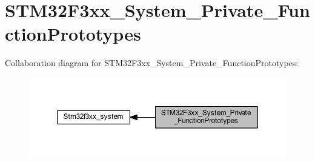 \hypertarget{group___s_t_m32_f3xx___system___private___function_prototypes}{}\section{S\+T\+M32\+F3xx\+\_\+\+System\+\_\+\+Private\+\_\+\+Function\+Prototypes}
\label{group___s_t_m32_f3xx___system___private___function_prototypes}
Collaboration diagram for S\+T\+M32\+F3xx\+\_\+\+System\+\_\+\+Private\+\_\+\+Function\+Prototypes\+:\nopagebreak
\begin{figure}[H]
\begin{center}
\leavevmode
\includegraphics[width=350pt]{group___s_t_m32_f3xx___system___private___function_prototypes}
\end{center}
\end{figure}
